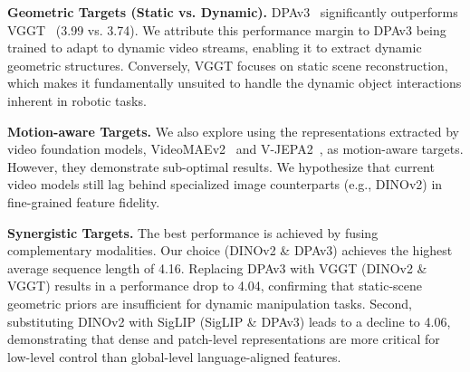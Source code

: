 \documentclass[runningheads]{llncs}
\begin{document}
\noindent \textbf{Geometric Targets (Static vs. Dynamic).} 
DPAv3~\cite{lin2025depth} significantly outperforms VGGT~\cite{wang2025vggt} (3.99 vs. 3.74). We attribute this performance margin to DPAv3 being trained to adapt to dynamic video streams, enabling it to extract dynamic geometric structures. Conversely, VGGT focuses on static scene reconstruction, which makes it fundamentally unsuited to handle the dynamic object interactions inherent in robotic tasks.

\noindent \textbf{Motion-aware Targets.} 
We also explore using the representations extracted by video foundation models, VideoMAEv2~\cite{wang2023videomae} and V-JEPA2~\cite{assran2025v}, as motion-aware targets. However, they demonstrate sub-optimal results. We hypothesize that current video models still lag behind specialized image counterparts (e.g., DINOv2) in fine-grained feature fidelity.

\noindent \textbf{Synergistic Targets.} 
The best performance is achieved by fusing complementary modalities. Our choice (DINOv2 \& DPAv3) achieves the highest average sequence length of 4.16. Replacing DPAv3 with VGGT (DINOv2 \& VGGT) results in a performance drop to 4.04, confirming that static-scene geometric priors are insufficient for dynamic manipulation tasks.
Second, substituting DINOv2 with SigLIP (SigLIP \& DPAv3) leads to a decline to 4.06, demonstrating that dense and patch-level representations are more critical for low-level control than global-level language-aligned features.
\end{document}
